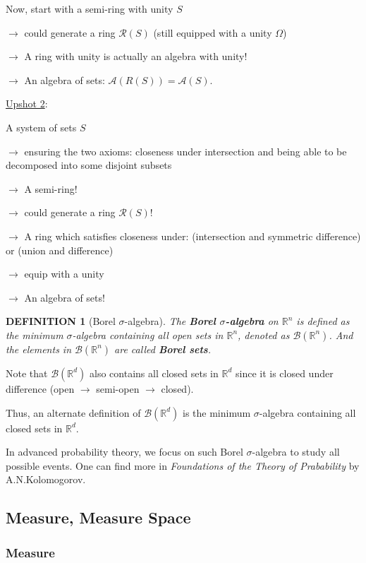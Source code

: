 \documentclass[12pt]{article}
\theoremstyle{blueplain}
\theoremstyle{bluedef}
\newtheorem{definition}{DEFINITION}[section]
\theoremstyle{blueremark}
\newcommand{\R}{\mathbb{R}}
\numberwithin{equation}{section}
\begin{document}
Now, start with a semi-ring with unity $S$

$\rightarrow$ could generate a ring $\mathcal{R}(S)$ (still equipped with a unity $\Omega$)

$\rightarrow$ A ring with unity is actually an algebra with unity!

$\rightarrow$ An algebra of sets: $\mathcal{A}(R(S)) = \mathcal{A}(S)$.

\underline{Upshot 2}:

A system of sets $S$

$\rightarrow$ ensuring the two axioms: closeness under intersection and being able to be decomposed into some disjoint subsets

$\rightarrow$ A semi-ring!

$\rightarrow$ could generate a ring $\mathcal{R}(S)$!

$\rightarrow$ A ring which satisfies closeness under: (intersection and symmetric difference) or (union and difference)

$\rightarrow$ equip with a unity

$\rightarrow$ An algebra of sets!

\begin{definition}[Borel $\sigma$-algebra]

  The \textbf{Borel $\sigma$-algebra} on $\R^n$ is defined as the minimum $\sigma$-algebra containing all open sets in $\R^n$, denoted as $\mathcal{B}(\R^n)$. And the elements in $\mathcal{B}(\R^n)$ are called \textbf{Borel sets}.
\end{definition}

Note that $\mathcal{B}(\R^d)$ also contains all closed sets in $\R^d$ since it is closed under difference (open $\rightarrow$ semi-open $\rightarrow$ closed).

Thus, an alternate definition of $\mathcal{B}(\R^d)$ is the minimum $\sigma$-algebra containing all closed sets in $\R^d$.

In advanced probability theory, we focus on such Borel $\sigma$-algebra to study all possible events. One can find more in \textit{Foundations of the Theory of Prabability} by A.N.Kolomogorov.

\clearpage

\subsection{Measure, Measure Space}

\subsubsection{Measure}
\end{document}
